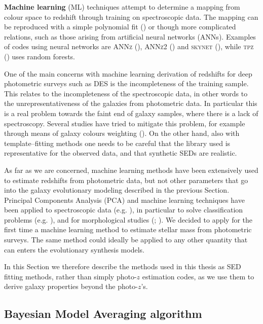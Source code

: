 {\bf Machine learning} (ML) techniques attempt to determine a mapping from colour space to redshift through training on spectroscopic data. The mapping can be reproduced with a simple polynomial fit (\citealt{connolly}) or though more complicated relations, such as those arising from artificial neural networks (ANNs). Examples of codes using neural networks are \textsc{ANNz} (\citealt{annz}), \textsc{ANNz2} (\citealt{annz2}) and \textsc{skynet} (\citealt{skynet}), while \textsc{tpz} (\citealt{tpz}) uses random forests.

One of the main concerns with machine learning derivation of redshifts for deep photometric surveys such as DES is the incompleteness of the training sample. This relates to the incompleteness of the spectroscopic data, in other words to the unrepresentativeness of the galaxies from photometric data. In particular this is a real problem towards the faint end of galaxy samples, where there is a lack of spectroscopy. Several studies have tried to mitigate this problem, for example through means of galaxy colours weighting (\citealt{lima}). On the other hand, also with template--fitting methods one needs to be careful that the library used is representative for the observed data, and that synthetic SEDs are realistic.

As far as we are concerned, machine learning methods have been extensively used to estimate redshifts from photometric data, but not other parameters  that go into the galaxy evolutionary modeling described in the previous Section. Principal Components Analysis (PCA) and machine learning techniques have been applied to spectroscopic data (e.g. \citealt{wisconsin}), in particular to solve classification problems (e.g. \citealt{quenching}), and for morphological studies (\citealt{gauci}; \citealt{schutter}). We decided to apply for the first time a machine learning method to estimate stellar mass from photometric surveys. The same method could ideally be applied to any other quantity that can enters the evolutionary synthesis models.

In this Section we therefore describe the methods used in this thesis as SED fitting methods, rather than simply photo-$z$ estimation codes, as we use them to derive galaxy properties beyond the photo-$z$'s. 

\subsection{Bayesian Model Averaging algorithm}\label{sec:BMA}

